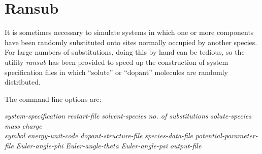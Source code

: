 \documentclass[a4paper,twoside]{report}
\begin{document}
\section{Ransub}%
\label{sec:ransub}
It is sometimes necessary to simulate systems in which one or
more components have been randomly substituted onto sites
normally occupied by another species. For large numbers of substitutions,
doing this by hand can be tedious, so the utility \emph{ransub} has been
provided to speed up the construction of system specification files in which
``solute'' or ``dopant'' molecules are randomly distributed.
        
The command line options are:
\begin{center}
\Lit{[-s} \textit{system-specification} \Lit{|}
 \textit{restart-file}\Lit{]}
\Lit{[-m} \textit{solvent-species}\Lit{]} 
\Lit{[-n} \textit{no. of substitutions}\Lit{]} 
\Lit{[-u} \textit{solute-species}\Lit{]}
\Lit{[-w} \textit{mass}\Lit{]} 
\Lit{[-q} \textit{charge}\Lit{]} \\
\Lit{[-z} \textit{symbol}\Lit{]}
\Lit{[-v} \textit{energy-unit-code}\Lit{]} 
\Lit{[-a} \textit{dopant-structure-file}\Lit{]}
\Lit{[-e} \textit{species-data-file}\Lit{]} 
\Lit{[-y} \textit{potential-parameter-file}\Lit{]} 
\Lit{[-f} \textit{Euler-angle-phi}\Lit{]}
\Lit{[-t} \textit{Euler-angle-theta}\Lit{]} 
\Lit{[-p} \textit{Euler-angle-psi}\Lit{]} 
\Lit{[-x]}
\Lit{[-h]}
\Lit{[-j]}
\Lit{[-c]}
\Lit{[-o} \textit{output-file}\Lit{]}
\end{center}
\end{document}
